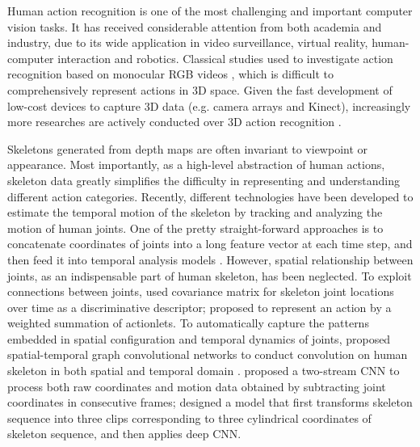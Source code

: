 \documentclass[a4paper,11pt]{article}
\begin{document}
Human action recognition is one of the most challenging and important computer vision tasks. It has received considerable attention from both academia and industry, due to its wide application in video surveillance, virtual reality, human-computer interaction and robotics. Classical studies used to investigate action recognition based on monocular RGB videos \cite{wang2007learning,simonyan2014two,wang2011action,wang2013action,le2011learning,liu2018computational}, which is difficult to comprehensively represent actions in 3D space. Given the fast development of low-cost devices to capture 3D data (e.g. camera arrays and Kinect), increasingly more researches are actively conducted over 3D action recognition \cite{vieira2012stop,chen2016real,luo2013group,wang2012robust,yang2012eigenjoints}.

Skeletons generated from depth maps are often invariant to viewpoint or appearance. Most importantly, as a high-level abstraction of human actions, skeleton data greatly simplifies the difficulty in representing and understanding different action categories. Recently, different technologies have been developed to estimate the temporal motion of the skeleton by tracking and analyzing the motion of human joints. One of the pretty straight-forward approaches is to concatenate coordinates of joints into a long feature vector at each time step, and then feed it into temporal analysis models \cite{wang2012mining,fernando2015modeling}. However, spatial relationship between joints, as an indispensable part of human skeleton, has been neglected. To exploit connections between joints, \cite{hussein2013human} used covariance matrix for skeleton joint locations over time as a discriminative descriptor; \cite{wang2012mining} proposed to represent an action by a weighted summation of actionlets. To automatically capture the patterns embedded in spatial configuration and temporal dynamics of joints, \cite{yan2018spatial} proposed spatial-temporal graph convolutional networks to conduct convolution on human skeleton in both spatial and temporal domain \cite{li2015gated,scarselli2009graph,bruna2013spectral,henaff2015deep,niepert2016learning}. \cite{li2017skeleton} proposed a two-stream CNN to process both raw coordinates and motion data obtained by subtracting joint coordinates in consecutive frames; \cite{ke2017new} designed a model that first transforms skeleton sequence into three clips corresponding to three cylindrical coordinates of skeleton sequence, and then applies deep CNN. %
\end{document}
